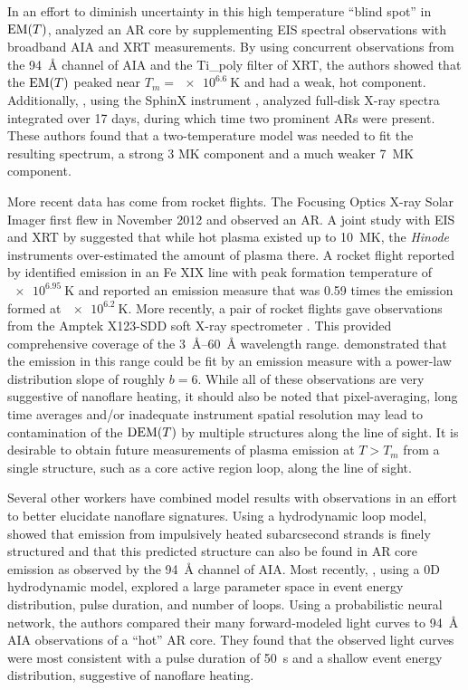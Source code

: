 In an effort to diminish uncertainty in this high temperature ``blind spot'' in $\emd[T]$, \citet{petralia_thermal_2014} analyzed an AR core by supplementing EIS spectral observations with broadband AIA and XRT measurements. By using concurrent observations from the  \SI{94}{\angstrom} channel of AIA and the Ti\_poly filter of XRT, the authors showed that the $\emd[T]$ peaked near $T_m = \SI{e6.6}{\kelvin}$ and had a weak, hot component. Additionally, \citet{miceli_x-ray_2012}, using the SphinX instrument \citep{sylwester_sphinx_2008,gburek_sphinx_2011}, analyzed full-disk X-ray spectra integrated over 17 days, during which time two prominent ARs were present. These authors found that a two-temperature model was needed to fit the resulting spectrum, a strong 3 MK component and a much weaker \SI{7}{\mega\kelvin} component.

More recent data has come from rocket flights. The Focusing Optics X-ray Solar Imager \citep[FOXSI,][]{krucker_focusing_2013} first flew in November 2012 and observed an AR. A joint study with EIS and XRT by \citet{ishikawa_constraining_2014} suggested that while hot plasma existed up to \SI{10}{\mega\kelvin}, the \textit{Hinode} instruments over-estimated the amount of plasma there. A rocket flight reported by \citet{brosius_pervasive_2014} identified emission in an Fe XIX line with peak formation temperature of $\SI{e6.95}{\kelvin}$ and reported an emission measure that was 0.59 times the emission formed at $\SI{e6.2}{\kelvin}$. More recently, a pair of rocket flights gave observations from the Amptek X123-SDD soft X-ray spectrometer \citep{caspi_new_2015}. This provided comprehensive coverage of the \SIrange{3}{60}{\angstrom} wavelength range. \citeauthor{caspi_new_2015} demonstrated that the emission in this range could be fit by an emission measure with a power-law distribution slope of roughly $b = 6$. While all of these observations are very suggestive of nanoflare heating, it should also be noted that pixel-averaging, long time averages and/or inadequate instrument spatial resolution may lead to contamination of the $\dem[T]$ by multiple structures along the line of sight. It is desirable to obtain future measurements of plasma emission at $T>T_m$ from a single structure, such as a core active region loop, along the line of sight.

Several other workers have combined model results with observations in an effort to better elucidate nanoflare signatures. Using a hydrodynamic loop model, \citet{reale_solar_2011} showed that emission from impulsively heated subarcsecond strands is finely structured and that this predicted structure can also be found in AR core emission as observed by the \SI{94}{\angstrom} channel of AIA. Most recently, \citet{tajfirouze_time-resolved_2016}, using a 0D hydrodynamic model, explored a large parameter space in event energy distribution, pulse duration, and number of loops. Using a probabilistic neural network, the authors compared their many forward-modeled light curves to  \SI{94}{\angstrom} AIA observations of a ``hot'' AR core. They found that the observed light curves were most consistent with a pulse duration of \SI{50}{\second} and a shallow event energy distribution, suggestive of nanoflare heating.

